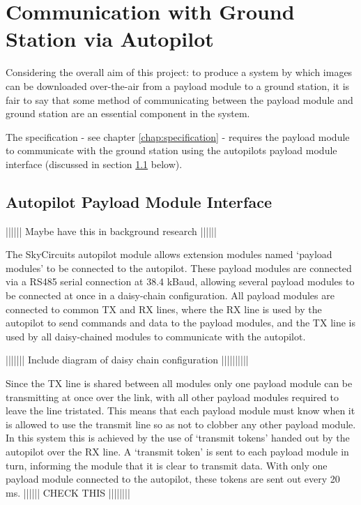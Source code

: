 


\section{Communication with Ground Station via Autopilot}
\label{sec:payload controller}
Considering the overall aim of this project: to produce a system by which 
images can be downloaded over-the-air from a payload module to a ground 
station, it is fair to say that some method of communicating between the
payload module and ground station are an essential component in the system.

The specification - see chapter \ref{chap:specification} - requires the payload
module to communicate with the ground station using the autopilots payload
module interface (discussed in section \ref{sec:autopilot_payload_interface}
below).


\subsection{Autopilot Payload Module Interface}
\label{sec:autopilot_payload_interface}
|||||| Maybe have this in background research ||||||

The SkyCircuits autopilot module allows extension modules named `payload 
modules' to be connected to the autopilot. These payload modules are connected 
via a RS485 serial connection at 38.4 kBaud, allowing several payload modules
to be connected at once in a daisy-chain configuration. All payload modules are 
connected to common TX and RX lines, where the RX line is used by the
autopilot to send commands and data to the payload modules, and the TX
line is used by all daisy-chained modules to communicate with the autopilot.

||||||| Include diagram of daisy chain configuration ||||||||||

Since the TX line is shared between all modules only one payload module can be 
transmitting at once over the link, with all other payload modules required to
leave the line tristated. This means that each payload module must know when it is
allowed to use the transmit line so as not to clobber any other payload module.
In this system this is achieved by the use of `transmit tokens' handed out 
by the autopilot over the RX line. A `transmit token' is sent to each payload 
module in turn, informing the module that it is clear to transmit data. With 
only one payload module connected to the autopilot, these tokens are sent out 
every 20 ms. |||||| CHECK THIS ||||||||

